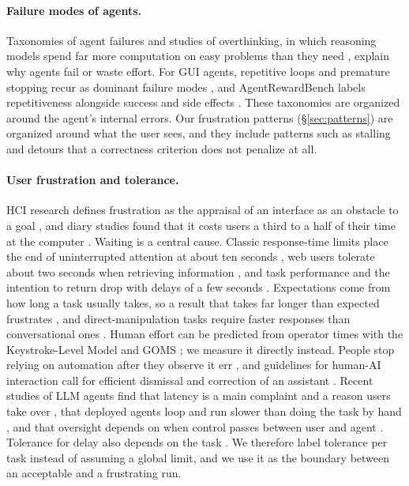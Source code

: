 \paragraph{Failure modes of agents.} Taxonomies of agent failures \citep{cemri2025mast,zhu2025agentdebug} and studies of overthinking, in which reasoning models spend far more computation on easy problems than they need \citep{chen2025overthinking,cuadron2025danger}, explain why agents fail or waste effort. For GUI agents, repetitive loops and premature stopping recur as dominant failure modes \citep{koh2024visualwebarena,han2026vlaagui,wei2026steplevel}, and AgentRewardBench labels repetitiveness alongside success and side effects \citep{lu2025agentrewardbench}. These taxonomies are organized around the agent's internal errors. Our frustration patterns (\S\ref{sec:patterns}) are organized around what the user sees, and they include patterns such as stalling and detours that a correctness criterion does not penalize at all.

\paragraph{User frustration and tolerance.} HCI research defines frustration as the appraisal of an interface as an obstacle to a goal \citep{bessiere2006model}, and diary studies found that it costs users a third to a half of their time at the computer \citep{ceaparu2004frustration,lazar2006severity}. Waiting is a central cause. Classic response-time limits place the end of uninterrupted attention at about ten seconds \citep{miller1968response,card1991information,nielsen1993usability}, web users tolerate about two seconds when retrieving information \citep{nah2004tolerable}, and task performance and the intention to return drop with delays of a few seconds \citep{galletta2004delays}. Expectations come from how long a task usually takes, so a result that takes far longer than expected frustrates \citep{shneiderman1984response}, and direct-manipulation tasks require faster responses than conversational ones \citep{dabrowski2011forty}. Human effort can be predicted from operator times with the Keystroke-Level Model and GOMS \citep{card1980keystroke,card1983psychology}; we measure it directly instead. People stop relying on automation after they observe it err \citep{parasuraman1997humans,lee2004trust,dietvorst2015algorithm}, and guidelines for human-AI interaction call for efficient dismissal and correction of an assistant \citep{horvitz1999principles,amershi2019guidelines}. Recent studies of LLM agents find that latency is a main complaint and a reason users take over \citep{mozannar2025magentic,maslych2025mitigating}, that deployed agents loop and run slower than doing the task by hand \citep{shome2026johnny,zhang2025unintended}, and that oversight depends on when control passes between user and agent \citep{huq2025cowpilot,huq2026modeling,chen2026oversight}. Tolerance for delay also depends on the task \citep{tan2026latency}. We therefore label tolerance per task instead of assuming a global limit, and we use it as the boundary between an acceptable and a frustrating run.
